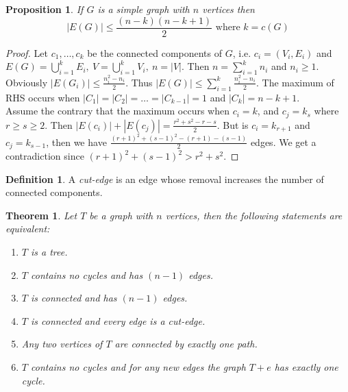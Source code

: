 \documentclass{article}
\newtheorem*{thm}{Theorem}
\newtheorem*{prop}{Proposition}
\theoremstyle{definition}
\newtheorem*{defn}{Definition}
\begin{document}
\begin{prop}
If $G$ is a simple graph with $n$ vertices then
$$|E(G)| \le \frac{(n-k)(n-k+1)}{2} \text{ where }k=c(G)$$
\end{prop}

\begin{proof}
Let $c_1,\ldots,c_k$ be the connected components of $G$, i.e. $c_i=(V_i,E_i)$ and $E(G) = \bigcup_{i=1}^k E_i,\ V=\bigcup_{i=1}^k V_i,\ n=|V|$.
Then $n=\sum_{i=1}^k n_i$ and $n_i \ge 1$.
Obviously $|E(G_i)| \le \frac{n_i^2 -n_i}{2}$.
Thus $|E(G)| \le \sum_{i=1}^k \frac{n_i^2-n_i}{2}$.
The maximum of RHS occurs when $|C_1| = |C_2| = \ldots = |C_{k-1}| = 1$ and $|C_k| = n-k +1$. \\
Assume the contrary that the maximum occurs when $c_i = k$, and $c_j = k_s$ where $r\ge s \ge 2$.
Then $|E(c_i)| + |E(c_j)| = \frac{r^2 + s^2 - r -s}{2}$.
But is $c_i = k_{r+1}$ and $c_j = k_{s-1}$, then we have $\frac{(r+1)^2 + (s-1)^2 - (r+1) -(s-1)}{2}$ edges.
We get a contradiction since $(r+1)^2 + (s-1)^2 > r^2 + s^2$.
\end{proof}

\begin{defn}
A \emph{cut-edge} is an edge whose removal increases the number of connected components.
\end{defn}

\begin{thm}
Let $T$ be a graph with $n$ vertices, then the following statements are equivalent:
\begin{enumerate}
\item $T$ is a tree.
\item $T$ contains no cycles and has $(n-1)$ edges.
\item $T$ is connected and has $(n-1)$ edges.
\item $T$ is connected and every edge is a cut-edge.
\item Any two vertices of $T$ are connected by exactly one path.
\item $T$ contains no cycles and for any new edges the graph $T + e$ has exactly one cycle.
\end{enumerate}
\end{thm}
\end{document}
